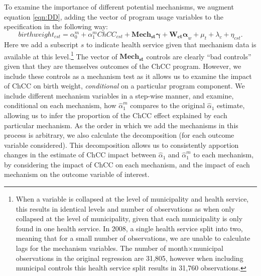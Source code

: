 \documentclass[12pt]{article}
\begin{document}
\begin{spacing}{1.4}
To examine the importance of different potential mechanisms, we augment
equation \ref{eqn:DD}, adding the vector of program usage variables to
the specification in the following way:
\begin{equation}
  \label{eqn:DDmech}
  birthweight_{cst} = \alpha^m_0 + \alpha^m_1 ChCC_{cst} + \bm{Mech_{st}\gamma} + \bm{W_{ct}\alpha}_{w} + \mu_t + \lambda_c + \eta_{cst}.
\end{equation}
Here we add a subscript $s$ to indicate health service given that mechanism
data is available at this level.\footnote{When a variable is collapsed at
  the level of municipality and health service, this results in identical
  levels and number of observations as when only collapsed at the level of
  municipality, given that each municipality is only found in one health
  service.  In 2008, a single health service split into two, meaning that
  for a small number of observations, we are unable to calculate lags for
  the mechanism variables.  The number of month$\times$municipal observations
  in the original regression are 31,805, however when including municipal
controls this health service split results in 31,760 observations.}
The vector of $\bm{Mech_{st}}$ controls are clearly ``bad controls''
\citep{AngristPischke2009} given that they are themselves outcomes of the
ChCC program. However, we include these controls as a mechanism test as
it allows us to examine the impact of ChCC on birth weight,
\emph{conditional} on a particular program component.  We include
different mechanism variables in a step-wise manner, and examine, conditional
on each mechanism, how $\widehat\alpha_1^m$ compares to the original
$\widehat\alpha_1$ estimate, allowing us to infer the proportion of the
ChCC effect explained by each particular mechanism.  As the order in
which we add the mechanisms in this process is arbitrary, %
we also calculate the \citet{Gelbach2016} decomposition (for each
outcome variable considered).  This decomposition allows us to consistently
apportion changes in the estimate of ChCC impact between $\widehat\alpha_1$
and $\widehat\alpha_1^m$ to each mechanism, by considering the impact of ChCC
on each mechanism, and the impact of each mechanism on the outcome
variable of interest.


\end{spacing}
\end{document}
